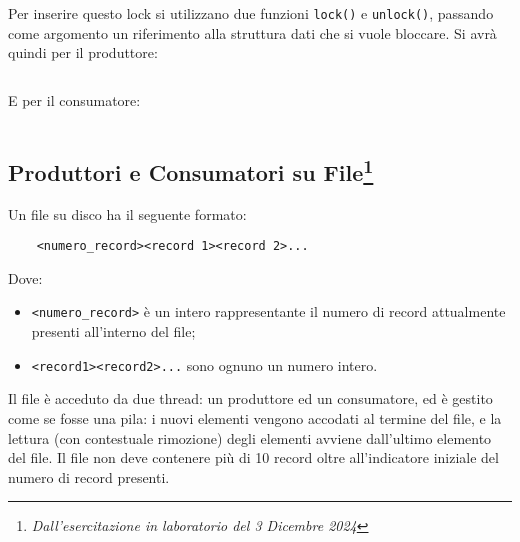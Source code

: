\documentclass{article}
\numberwithin{equation}{subsection}
\begin{document}
Per inserire questo lock si utilizzano due funzioni \verb|lock()| 
e \verb|unlock()|, passando come argomento un riferimento alla struttura dati 
che si vuole bloccare. Si avrà quindi per il produttore:
\inputminted[firstline=38, lastline=53]{c}{./Programmazione Concorrente/consumatore_produttore.c}
E per il consumatore:
\inputminted[firstline=55, lastline=67]{c}{./Programmazione Concorrente/consumatore_produttore.c}

\subsection{Produttori e Consumatori su File\footnote{\textit{Dall'esercitazione in laboratorio del 3 Dicembre 2024}}}

Un file su disco ha il seguente formato:
\begin{verbatim}
    <numero_record><record 1><record 2>...
\end{verbatim}
Dove: 
\begin{itemize}
    \item \verb|<numero_record>| è un intero rappresentante il numero di record attualmente presenti all'interno del file;
    \item \verb|<record1><record2>...| sono ognuno un numero intero.
\end{itemize}
Il file è acceduto da due thread: un produttore ed un consumatore, ed è gestito come se fosse una pila: i nuovi elementi vengono accodati al termine del file, e la lettura (con contestuale rimozione) degli elementi avviene dall'ultimo elemento del file. Il file non deve contenere più di 10 record oltre all'indicatore iniziale del numero di record presenti.
\end{document}
